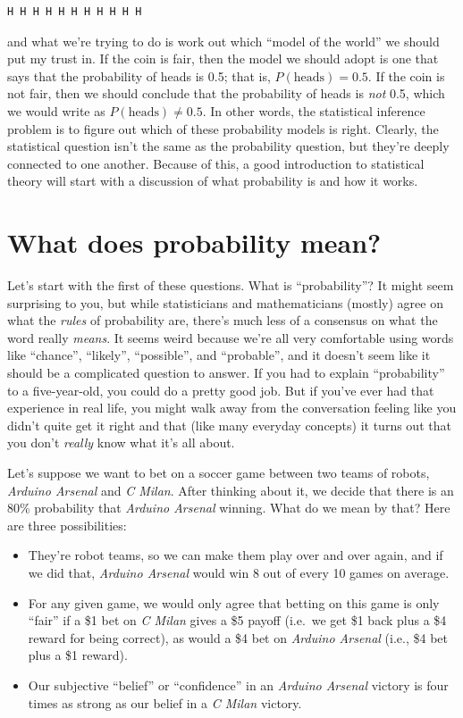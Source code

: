 \documentclass[
]{book}
\providecommand{\tightlist}{%
  \setlength{\itemsep}{0pt}\setlength{\parskip}{0pt}}
\theoremstyle{definition}
\theoremstyle{definition}
\theoremstyle{definition}
\theoremstyle{definition}
\theoremstyle{remark}
\begin{document}
\begin{verbatim}
H H H H H H H H H H H
\end{verbatim}

and what we're trying to do is work out which ``model of the world'' we should put my trust in. If the coin is fair, then the model we should adopt is one that says that the probability of heads is 0.5; that is, \(P(\mbox{heads}) = 0.5\). If the coin is not fair, then we should conclude that the probability of heads is \emph{not} 0.5, which we would write as \(P(\mbox{heads}) \neq 0.5\). In other words, the statistical inference problem is to figure out which of these probability models is right. Clearly, the statistical question isn't the same as the probability question, but they're deeply connected to one another. Because of this, a good introduction to statistical theory will start with a discussion of what probability is and how it works.

\hypertarget{probabilitymeaning}{%
\section{What does probability mean?}\label{probabilitymeaning}}

Let's start with the first of these questions. What is ``probability''? It might seem surprising to you, but while statisticians and mathematicians (mostly) agree on what the \emph{rules} of probability are, there's much less of a consensus on what the word really \emph{means}. It seems weird because we're all very comfortable using words like ``chance'', ``likely'', ``possible'', and ``probable'', and it doesn't seem like it should be a complicated question to answer. If you had to explain ``probability'' to a five-year-old, you could do a pretty good job. But if you've ever had that experience in real life, you might walk away from the conversation feeling like you didn't quite get it right and that (like many everyday concepts) it turns out that you don't \emph{really} know what it's all about.

Let's suppose we want to bet on a soccer game between two teams of robots, \emph{Arduino Arsenal} and \emph{C Milan}. After thinking about it, we decide that there is an 80\% probability that \emph{Arduino Arsenal} winning. What do we mean by that? Here are three possibilities:

\begin{itemize}
\tightlist
\item
  They're robot teams, so we can make them play over and over again, and if we did that, \emph{Arduino Arsenal} would win 8 out of every 10 games on average.
\item
  For any given game, we would only agree that betting on this game is only ``fair'' if a \$1 bet on \emph{C Milan} gives a \$5 payoff (i.e.~we get \$1 back plus a \$4 reward for being correct), as would a \$4 bet on \emph{Arduino Arsenal} (i.e., \$4 bet plus a \$1 reward).
\item
  Our subjective ``belief'' or ``confidence'' in an \emph{Arduino Arsenal} victory is four times as strong as our belief in a \emph{C Milan} victory.
\end{itemize}
\end{document}
